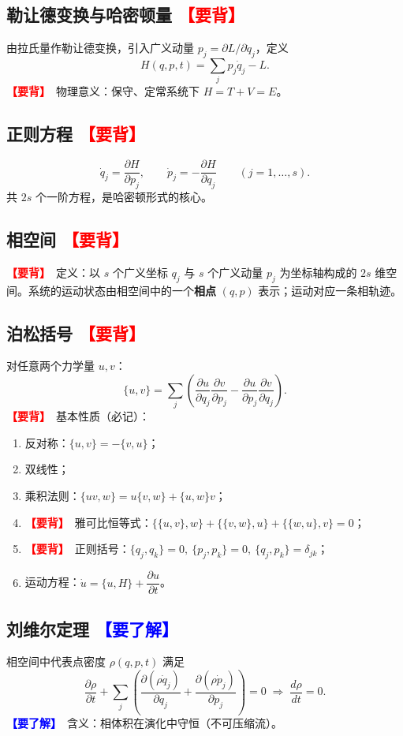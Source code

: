 \documentclass[UTF8,a4paper,11pt]{ctexart}
\newcommand{\bp}[1]{\textcolor{red}{\textbf{【要背】}}\ #1}
\newcommand{\uf}[1]{\textcolor{blue}{\textbf{【要了解】}}\ #1}
\begin{document}
\subsection{勒让德变换与哈密顿量 \bp{}}
由拉氏量作勒让德变换，引入广义动量 $p_j=\partial L/\partial\dot q_j$，定义
\[
\boxed{H(q,p,t)=\sum_j p_j\dot q_j-L.}
\]
\bp{物理意义}：保守、定常系统下 $H=T+V=E$。

\subsection{正则方程 \bp{}}
\[
\boxed{\dot q_j=\frac{\partial H}{\partial p_j},\qquad
\dot p_j=-\frac{\partial H}{\partial q_j}}\qquad(j=1,\dots,s).
\]
共 $2s$ 个一阶方程，是哈密顿形式的核心。

\subsection{相空间 \bp{}}
\bp{定义}：以 $s$ 个广义坐标 $q_j$ 与 $s$ 个广义动量 $p_j$ 为坐标轴构成的 $2s$ 维空间。系统的运动状态由相空间中的一个\textbf{相点} $(q,p)$ 表示；运动对应一条相轨迹。

\subsection{泊松括号 \bp{}}
对任意两个力学量 $u,v$：
\[
\boxed{\{u,v\}=\sum_j\left(\frac{\partial u}{\partial q_j}\frac{\partial v}{\partial p_j}
-\frac{\partial u}{\partial p_j}\frac{\partial v}{\partial q_j}\right)}.
\]
\bp{基本性质（必记）}：
\begin{enumerate}[itemsep=1pt]
  \item 反对称：$\{u,v\}=-\{v,u\}$；
  \item 双线性；
  \item 乘积法则：$\{uv,w\}=u\{v,w\}+\{u,w\}v$；
  \item \bp{雅可比恒等式}：$\{\{u,v\},w\}+\{\{v,w\},u\}+\{\{w,u\},v\}=0$；
  \item \bp{正则括号}：$\{q_j,q_k\}=0,\ \{p_j,p_k\}=0,\ \{q_j,p_k\}=\delta_{jk}$；
  \item 运动方程：$\dot u=\{u,H\}+\dfrac{\partial u}{\partial t}$。
\end{enumerate}

\subsection{刘维尔定理 \uf{}}
相空间中代表点密度 $\rho(q,p,t)$ 满足
\[
\frac{\partial\rho}{\partial t}+\sum_j\left(\frac{\partial(\rho\dot q_j)}{\partial q_j}
+\frac{\partial(\rho\dot p_j)}{\partial p_j}\right)=0
\;\Rightarrow\;\frac{d\rho}{dt}=0.
\]
\uf{含义}：相体积在演化中守恒（不可压缩流）。
\end{document}
